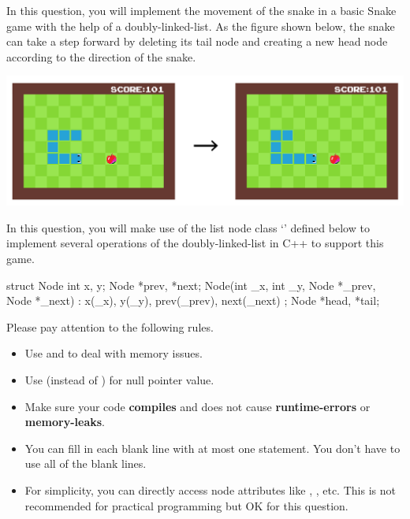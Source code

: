 
In this question, you will implement the movement of the snake in a basic Snake game with the help of a doubly-linked-list. As the figure shown below, the snake can take a step forward by deleting its tail node and creating a new head node according to the direction of the snake.

\begin{center}
	\includegraphics[width = \linewidth]{img/snake.png}
\end{center}

In this question, you will make use of the list node class `' defined below to implement several operations of the doubly-linked-list in C++ to support this game.

\begin{cpp}
    struct Node {
      int x, y;
      Node *prev, *next;
      Node(int _x, int _y, Node *_prev, Node *_next)
    	  : x(_x), y(_y), prev(_prev), next(_next) {}
    };
    Node *head, *tail;
\end{cpp}

Please pay attention to the following rules.

\begin{itemize}
	\item Use  and  to deal with memory issues.
	\item Use  (instead of ) for null pointer value.
	\item Make sure your code \textbf{compiles} and does not cause \textbf{runtime-errors} or \textbf{memory-leaks}.
	\item You can fill in each blank line with at most one statement. You don't have to use all of the blank lines.
	\item For simplicity, you can directly access node attributes like , , etc. This is not recommended for practical programming but OK for this question.
\end{itemize}

